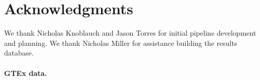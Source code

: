 \documentclass[10pt,letterpaper]{article}
\begin{document}



\section*{Acknowledgments}
We thank Nicholas Knoblauch and Jason Torres for initial pipeline
development and planning. We thank Nicholas Miller for assistance building
the results database.

%


\paragraph{GTEx data.}\label{gtex-data}
\end{document}
